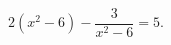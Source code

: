 \begin{ex}[type=equation]
	\begin{condition}
		$2\left(x^2 - 6\right) - \dfrac{3}{x^2 - 6} = 5.$
	\end{condition}
\end{ex}